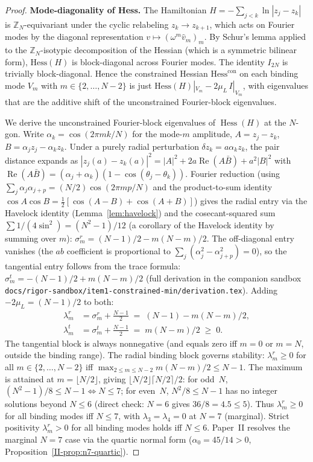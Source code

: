\begin{proof}
\textbf{Mode-diagonality of Hess.}
The Hamiltonian $H = -\sum_{j<k}\ln|z_j - z_k|$ is
$\mathbb{Z}_N$-equivariant under the cyclic relabeling
$z_k \to z_{k+1}$, which acts on Fourier modes by the
diagonal representation $v \mapsto (\omega^m \hat v_m)_{m}$.
By Schur's lemma applied to the $\mathbb{Z}_N$-isotypic
decomposition of the Hessian (which is a symmetric bilinear
form), $\mathrm{Hess}(H)$ is block-diagonal across Fourier
modes.  The identity $I_{2N}$ is trivially block-diagonal.
Hence the constrained Hessian $\mathrm{Hess}^{\mathrm{con}}$
on each binding mode $V_m$ with $m \in \{2, \ldots, N-2\}$ is
just $\mathrm{Hess}(H)|_{V_m} - 2\mu_L\,I|_{V_m}$, with
eigenvalues that are the additive shift of the unconstrained
Fourier-block eigenvalues.

We derive the unconstrained Fourier-block eigenvalues of
$\operatorname{Hess}(H)$ at the $N$-gon.
Write $\alpha_k = \cos(2\pi mk/N)$ for the mode-$m$ amplitude,
$A = z_j - z_k$, $B = \alpha_j z_j - \alpha_k z_k$.
Under a purely radial perturbation $\delta z_k = a\alpha_k z_k$,
the pair distance expands as
$|z_j(a) - z_k(a)|^2 = |A|^2 + 2a\operatorname{Re}(A\bar B) + a^2|B|^2$
with $\operatorname{Re}(A\bar B) = (\alpha_j + \alpha_k)(1 - \cos(\theta_j - \theta_k))$.
Fourier reduction (using
$\sum_j \alpha_j\alpha_{j+p} = (N/2)\cos(2\pi mp/N)$ and the
product-to-sum identity $\cos A\cos B = \tfrac12[\cos(A{-}B) + \cos(A{+}B)]$)
gives the radial entry via the Havelock identity
(Lemma~\ref{lem:havelock}) and the cosecant-squared sum
$\sum 1/(4\sin^2) = (N^2{-}1)/12$ (a corollary of the Havelock
identity by summing over $m$):
$\sigma_m^r = (N{-}1)/2 - m(N{-}m)/2$.
The off-diagonal entry vanishes (the $ab$ coefficient
is proportional to $\sum_j(\alpha_j^2 - \alpha_{j+p}^2) = 0$),
so the tangential entry follows from the trace formula:
$\sigma_m^t = -(N{-}1)/2 + m(N{-}m)/2$
(full derivation in the companion sandbox
\texttt{docs/rigor-sandbox/item1-constrained-min/derivation.tex}).
Adding $-2\mu_L = (N{-}1)/2$ to both:
\begin{align*}
  \lambda_m^r &= \sigma_m^r + \tfrac{N-1}{2}
    \;=\; (N-1) - m(N-m)/2, \\
  \lambda_m^t &= \sigma_m^t + \tfrac{N-1}{2}
    \;=\; m(N-m)/2 \;\ge\; 0.
\end{align*}
The tangential block is always nonnegative (and equals zero
iff $m = 0$ or $m = N$, outside the binding range).
The radial binding block governs stability:
$\lambda_m^r \ge 0$ for all $m \in \{2, \ldots, N-2\}$
iff $\max_{2 \le m \le N-2} m(N-m)/2 \le N-1$.
The maximum is attained at $m = \lfloor N/2 \rfloor$,
giving $\lfloor N/2 \rfloor \lceil N/2 \rceil/2$:
for odd~$N$, $(N^2-1)/8 \le N-1 \iff N \le 7$; for
even~$N$, $N^2/8 \le N-1$ has no integer solutions beyond
$N \le 6$ (direct check: $N=6$ gives $36/8 = 4.5 \le 5$).
Thus $\lambda_m^r \ge 0$ for all binding modes iff
$N \le 7$, with $\lambda_3 = \lambda_4 = 0$ at $N = 7$
(marginal).  Strict positivity $\lambda_m^r > 0$ for all
binding modes holds iff $N \le 6$.
Paper~II resolves the marginal $N = 7$ case via
the quartic normal form ($\alpha_0 = 45/14 > 0$,
Proposition~\ref*{II-prop:n7-quartic}).
\end{proof}


